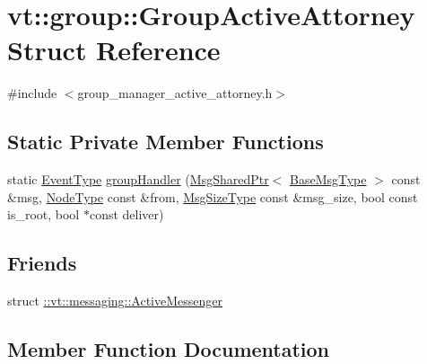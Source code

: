 \hypertarget{structvt_1_1group_1_1_group_active_attorney}{}\section{vt\+:\+:group\+:\+:Group\+Active\+Attorney Struct Reference}
\label{structvt_1_1group_1_1_group_active_attorney}


{\ttfamily \#include $<$group\+\_\+manager\+\_\+active\+\_\+attorney.\+h$>$}

\subsection*{Static Private Member Functions}
\begin{DoxyCompactItemize}
\item 
static \hyperlink{namespacevt_a009267401def7ae8bf201892222d060f}{Event\+Type} \hyperlink{structvt_1_1group_1_1_group_active_attorney_a1f912dce4eb510000705058ab4872152}{group\+Handler} (\hyperlink{namespacevt_ab2b3d506ec8e8d1540aede826d84a239}{Msg\+Shared\+Ptr}$<$ \hyperlink{namespacevt_a44d0d4e144748f2b19a1cfd962f50338}{Base\+Msg\+Type} $>$ const \&msg, \hyperlink{namespacevt_a866da9d0efc19c0a1ce79e9e492f47e2}{Node\+Type} const \&from, \hyperlink{namespacevt_a408e86a8c7c89309b52907dc5a513924}{Msg\+Size\+Type} const \&msg\+\_\+size, bool const is\+\_\+root, bool $\ast$const deliver)
\end{DoxyCompactItemize}
\subsection*{Friends}
\begin{DoxyCompactItemize}
\item 
struct \hyperlink{structvt_1_1group_1_1_group_active_attorney_a31cb499e12b002c0912506ddca0efcaa}{\+::vt\+::messaging\+::\+Active\+Messenger}
\end{DoxyCompactItemize}


\subsection{Member Function Documentation}
\mbox{\label{structvt_1_1group_1_1_group_active_attorney_a1f912dce4eb510000705058ab4872152}} 

